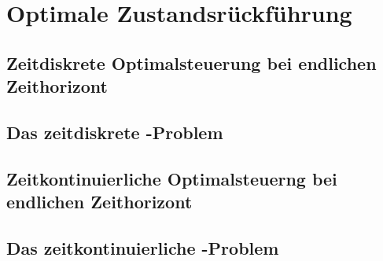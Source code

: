 \chapter{Optimale Zustandsrückführung}
\section{Zeitdiskrete Optimalsteuerung bei endlichen Zeithorizont}


\section{Das zeitdiskrete -Problem}

\section{Zeitkontinuierliche Optimalsteuerng bei endlichen Zeithorizont}
\label{sec:3_3_zeitkont_opt_endl}

\section{Das zeitkontinuierliche -Problem}

